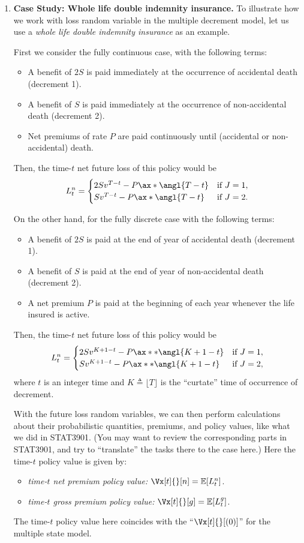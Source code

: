 \begin{enumerate}
\item \label{it:double-indemn} \textbf{Case Study: Whole life double indemnity
insurance.} To illustrate how we work with loss random variable in the multiple
decrement model, let us use a \emph{whole life double indemnity insurance} as
an example.

First we consider the fully continuous case, with the following terms:
\begin{itemize}
\item A benefit of \(2S\) is paid immediately at the occurrence of accidental death (decrement 1).
\item A benefit of \(S\) is paid immediately at the occurrence of non-accidental death (decrement 2).
\item Net premiums of rate \(P\) are paid continuously until (accidental or non-accidental) death.
\end{itemize}
Then, the time-\(t\) net future loss of this policy would be
\[
L_t^n=\begin{cases}
2Sv^{T-t}-P\ax*{\angl{T-t}}&\text{if \(J=1\)}, \\
Sv^{T-t}-P\ax*{\angl{T-t}}&\text{if \(J=2\)}.
\end{cases}
\]

On the other hand, for the fully discrete case with the following terms:
\begin{itemize}
\item A benefit of \(2S\) is paid at the end of year of accidental death (decrement 1).
\item A benefit of \(S\) is paid at the end of year of non-accidental death (decrement 2).
\item A net premium \(P\) is paid at the beginning of each year whenever the life insured is active.
\end{itemize}
Then, the time-\(t\) net future loss of this policy would be
\[
L_t^n=\begin{cases}
2Sv^{K+1-t}-P\ax**{\angl{K+1-t}}&\text{if \(J=1\)}, \\
Sv^{K+1-t}-P\ax**{\angl{K+1-t}}&\text{if \(J=2\)},
\end{cases}
\]
where \(t\) is an integer time and \(K\triangleq\lfloor T\rfloor\) is the
``curtate'' time of occurrence of decrement.

With the future loss random variables, we can then perform calculations about
their probabilistic quantities, premiums, and policy values, like what we did
in STAT3901. (You may want to review  the corresponding
parts in STAT3901, and try to ``translate'' the tasks there to the case here.)
Here the time-\(t\) policy value is given by:
\begin{itemize}
\item \emph{time-\(t\) net premium policy value:} \(\Vx[t]{}[n]=\expv{L_t^n}\).
\item \emph{time-\(t\) gross premium policy value:} \(\Vx[t]{}[g]=\expv{L_t^g}\).
\end{itemize}
The time-\(t\) policy value here coincides with the ``\(\Vx[t]{}[(0)]\)'' for
the multiple state model.
\end{enumerate}

